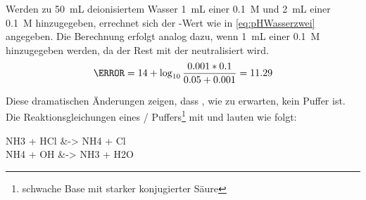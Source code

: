 \documentclass{article}
\begin{document}
        Werden zu \SI[mode=text]{50}{\milli\liter} deionisiertem Wasser \SI[mode=text]{1}{\milli\liter} einer \SI[mode=text]{0.1}{M}  und \SI[mode=text]{2}{\milli\liter} einer \SI[mode=text]{0.1}{M}  hinzugegeben, errechnet sich der \pH-Wert wie in \eqref{eq:pHWasserzwei} angegeben. Die Berechnung erfolgt analog dazu, wenn \SI[mode=text]{1}{\milli\liter} einer \SI[mode=text]{0.1}{M}  hinzugegeben werden, da der Rest mit der  neutralisiert wird.\\
        
        \begin{equation}
          \pH = 14 + \log _{10} \frac{0.001 * 0.1}{0.05 + 0.001} = 11.29 \label{eq:pHWasserzwei}
        \end{equation}
        
        Diese dramatischen Änderungen zeigen, dass , wie zu erwarten, kein Puffer ist. \\
        
        Die Reaktionsgleichungen eines / Puffers\footnote{schwache Base mit starker konjugierter Säure} mit  und  lauten wie folgt:
        
        \begin{reactions}
          NH3\aq{} + HCl\aq{} &-> NH4\pch\aq{} + Cl\mch\aq{} \\
          NH4\pch\aq{} + OH\mch\aq{} &-> NH3\aq{} + H2O
        \end{reactions}
        
  \pagebreak
  
  \listofreactions
  \printbibliography[title=Literaturverzeichnis]
  \listoftables
  
\end{document}
